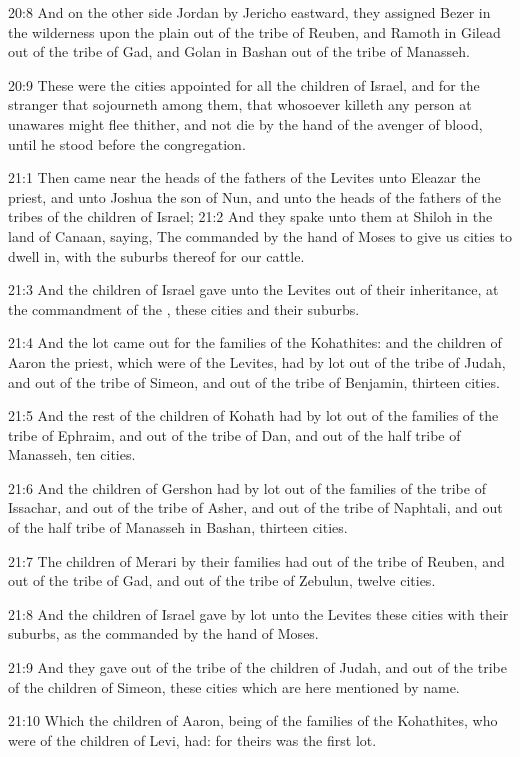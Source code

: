 20:8 And on the other side Jordan by Jericho eastward, they assigned
Bezer in the wilderness upon the plain out of the tribe of Reuben, and
Ramoth in Gilead out of the tribe of Gad, and Golan in Bashan out of
the tribe of Manasseh.

20:9 These were the cities appointed for all the children of Israel,
and for the stranger that sojourneth among them, that whosoever
killeth any person at unawares might flee thither, and not die by the
hand of the avenger of blood, until he stood before the congregation.

21:1 Then came near the heads of the fathers of the Levites unto
Eleazar the priest, and unto Joshua the son of Nun, and unto the heads
of the fathers of the tribes of the children of Israel; 21:2 And they
spake unto them at Shiloh in the land of Canaan, saying, The \LORD
commanded by the hand of Moses to give us cities to dwell in, with the
suburbs thereof for our cattle.

21:3 And the children of Israel gave unto the Levites out of their
inheritance, at the commandment of the \LORD, these cities and their
suburbs.

21:4 And the lot came out for the families of the Kohathites: and the
children of Aaron the priest, which were of the Levites, had by lot
out of the tribe of Judah, and out of the tribe of Simeon, and out of
the tribe of Benjamin, thirteen cities.

21:5 And the rest of the children of Kohath had by lot out of the
families of the tribe of Ephraim, and out of the tribe of Dan, and out
of the half tribe of Manasseh, ten cities.

21:6 And the children of Gershon had by lot out of the families of the
tribe of Issachar, and out of the tribe of Asher, and out of the tribe
of Naphtali, and out of the half tribe of Manasseh in Bashan, thirteen
cities.

21:7 The children of Merari by their families had out of the tribe of
Reuben, and out of the tribe of Gad, and out of the tribe of Zebulun,
twelve cities.

21:8 And the children of Israel gave by lot unto the Levites these
cities with their suburbs, as the \LORD commanded by the hand of Moses.

21:9 And they gave out of the tribe of the children of Judah, and out
of the tribe of the children of Simeon, these cities which are here
mentioned by name.

21:10 Which the children of Aaron, being of the families of the
Kohathites, who were of the children of Levi, had: for theirs was the
first lot.

